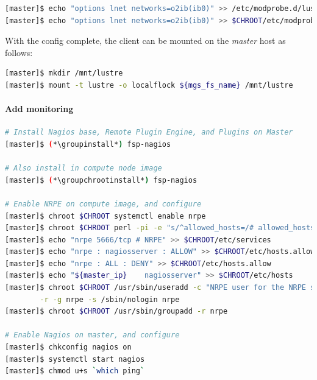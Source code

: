 \documentclass[letterpaper]{article}
\newcommand{\groupinstall}{yum -y groupinstall}
\newcommand{\groupchrootinstall}{yum -y --installroot=\$CHROOT groupinstall}
\begin{document}
\begin{lstlisting}[language=bash,keywords={},upquote=true]
[master]$ echo "options lnet networks=o2ib(ib0)" >> /etc/modprobe.d/lustre.conf
[master]$ echo "options lnet networks=o2ib(ib0)" >> $CHROOT/etc/modprobe.d/lustre.conf
\end{lstlisting}

With the \Lustre{} config complete, the client can be mounted on the {\em master}
host as follows:
\begin{lstlisting}[language=bash,keywords={},upquote=true]
[master]$ mkdir /mnt/lustre
[master]$ mount -t lustre -o localflock ${mgs_fs_name} /mnt/lustre
\end{lstlisting}

\paragraph{Add \Nagios{} monitoring}



\begin{lstlisting}[language=bash,keywords={},upquote=true]
# Install Nagios base, Remote Plugin Engine, and Plugins on Master
[master]$ (*\groupinstall*) fsp-nagios

# Also install in compute node image
[master]$ (*\groupchrootinstall*) fsp-nagios

# Enable NRPE on compute image, and configure
[master]$ chroot $CHROOT systemctl enable nrpe
[master]$ chroot $CHROOT perl -pi -e "s/^allowed_hosts=/# allowed_hosts=/" /etc/nagios/nrpe.cfg
[master]$ echo "nrpe 5666/tcp # NRPE" >> $CHROOT/etc/services
[master]$ echo "nrpe : nagiosserver : ALLOW" >> $CHROOT/etc/hosts.allow
[master]$ echo "nrpe : ALL : DENY" >> $CHROOT/etc/hosts.allow
[master]$ echo "${master_ip}    nagiosserver" >> $CHROOT/etc/hosts
[master]$ chroot $CHROOT /usr/sbin/useradd -c "NRPE user for the NRPE service" -d /var/run/nrpe \
        -r -g nrpe -s /sbin/nologin nrpe
[master]$ chroot $CHROOT /usr/sbin/groupadd -r nrpe

# Enable Nagios on master, and configure
[master]$ chkconfig nagios on
[master]$ systemctl start nagios
[master]$ chmod u+s `which ping`
\end{lstlisting}
\end{document}
